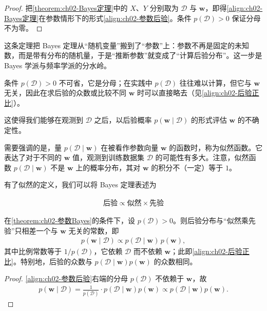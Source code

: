 \documentclass[../../main.tex]{subfiles}
\begin{document}
\begin{proof}
把\cref{theorem:ch02-Bayes定理}中的 $X$、$Y$ 分别取为 $\mathcal{D}$ 与 $\mathbf{w}$，即得\eqref{align:ch02-Bayes定理}在参数情形下的形式\eqref{align:ch02-参数后验}。条件 $p(\mathcal{D})>0$ 保证分母不为零。
\end{proof}

\begin{remark}
这条定理把 Bayes 定理从“随机变量”搬到了“参数”上：参数不再是固定的未知数，而是带有分布的随机量，于是“推断参数”就变成了“计算后验分布”。这一步是 Bayes 学派与频率学派的分水岭。

条件 $p(\mathcal{D})>0$ 不可省，它是分母；在实践中 $p(\mathcal{D})$ 往往难以计算，但它与 $\mathbf{w}$ 无关，因此在求后验的众数或比较不同 $\mathbf{w}$ 时可以直接略去（见\eqref{align:ch02-后验正比}）。
\end{remark}

这使得我们能够在观测到 $\mathcal{D}$ 之后，以后验概率 $p(\mathbf{w}\mid\mathcal{D})$ 的形式评估 $\mathbf{w}$ 的不确定性。

需要强调的是，量 $p(\mathcal{D}\mid\mathbf{w})$ 在被看作参数向量 $\mathbf{w}$ 的函数时，称为似然函数。它表达了对于不同的 $\mathbf{w}$ 值，观测到训练数据集 $\mathcal{D}$ 的可能性有多大。注意，似然函数 $p(\mathcal{D}\mid\mathbf{w})$ 不是 $\mathbf{w}$ 上的概率分布，其对 $\mathbf{w}$ 的积分不（一定）等于 $1$。

有了似然的定义，我们可以将 Bayes 定理表述为

\begin{align}
  \text{后验} \propto \text{似然} \times \text{先验}
  \label{align:ch02-后验正比}
\end{align}

\begin{proposition}[后验正比于似然乘先验]\label{proposition:ch02-后验正比}
在\cref{theorem:ch02-参数Bayes}的条件下，设 $p(\mathcal{D})>0$。则后验分布与“似然乘先验”只相差一个与 $\mathbf{w}$ 无关的常数，即
\begin{align*}
  p(\mathbf{w}\mid\mathcal{D})\propto p(\mathcal{D}\mid\mathbf{w})\,p(\mathbf{w}),
\end{align*}
其中比例常数等于 $1/p(\mathcal{D})$，它依赖 $\mathcal{D}$ 而不依赖 $\mathbf{w}$；此即\eqref{align:ch02-后验正比}。特别地，后验的众数与 $p(\mathcal{D}\mid\mathbf{w})p(\mathbf{w})$ 的众数相同。
\end{proposition}

\begin{proof}
\eqref{align:ch02-参数后验}右端的分母 $p(\mathcal{D})$ 不依赖于 $\mathbf{w}$，故
\begin{align*}
  p(\mathbf{w}\mid\mathcal{D}) = \frac{1}{p(\mathcal{D})}\cdot p(\mathcal{D}\mid\mathbf{w})p(\mathbf{w}) \propto p(\mathcal{D}\mid\mathbf{w})p(\mathbf{w}) .
\end{align*}
\end{proof}
\end{document}
